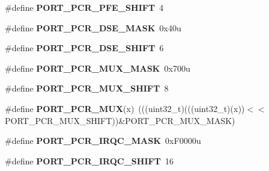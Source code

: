 \begin{DoxyCompactItemize}
\item 
\mbox{\label{group___p_o_r_t___register___masks_gae7d057ebd3218784fca57f55a85f2d29}} 
\#define {\bfseries P\+O\+R\+T\+\_\+\+P\+C\+R\+\_\+\+P\+F\+E\+\_\+\+S\+H\+I\+FT}~4
\item 
\mbox{\label{group___p_o_r_t___register___masks_gae1c37b9f66e58bd80e7764232fd05cee}} 
\#define {\bfseries P\+O\+R\+T\+\_\+\+P\+C\+R\+\_\+\+D\+S\+E\+\_\+\+M\+A\+SK}~0x40u
\item 
\mbox{\label{group___p_o_r_t___register___masks_ga00ae08038ade5432d0240666658d8867}} 
\#define {\bfseries P\+O\+R\+T\+\_\+\+P\+C\+R\+\_\+\+D\+S\+E\+\_\+\+S\+H\+I\+FT}~6
\item 
\mbox{\label{group___p_o_r_t___register___masks_ga0feec5fc6b285b83c573f913c74e5c41}} 
\#define {\bfseries P\+O\+R\+T\+\_\+\+P\+C\+R\+\_\+\+M\+U\+X\+\_\+\+M\+A\+SK}~0x700u
\item 
\mbox{\label{group___p_o_r_t___register___masks_gaa39e1cfed4df3797e4f1d141adab8776}} 
\#define {\bfseries P\+O\+R\+T\+\_\+\+P\+C\+R\+\_\+\+M\+U\+X\+\_\+\+S\+H\+I\+FT}~8
\item 
\mbox{\label{group___p_o_r_t___register___masks_ga13b6c873e0e5385583b1f7907a9f796a}} 
\#define {\bfseries P\+O\+R\+T\+\_\+\+P\+C\+R\+\_\+\+M\+UX}(x)~(((uint32\+\_\+t)(((uint32\+\_\+t)(x))$<$$<$P\+O\+R\+T\+\_\+\+P\+C\+R\+\_\+\+M\+U\+X\+\_\+\+S\+H\+I\+FT))\&P\+O\+R\+T\+\_\+\+P\+C\+R\+\_\+\+M\+U\+X\+\_\+\+M\+A\+SK)
\item 
\mbox{\label{group___p_o_r_t___register___masks_gabaef70d886fda0a7da8e862308bf5909}} 
\#define {\bfseries P\+O\+R\+T\+\_\+\+P\+C\+R\+\_\+\+I\+R\+Q\+C\+\_\+\+M\+A\+SK}~0x\+F0000u
\item 
\mbox{\label{group___p_o_r_t___register___masks_ga0bda43cd85ca4d5df17f12a193937d81}} 
\#define {\bfseries P\+O\+R\+T\+\_\+\+P\+C\+R\+\_\+\+I\+R\+Q\+C\+\_\+\+S\+H\+I\+FT}~16
\item 
$$
\end{DoxyCompactItemize}
